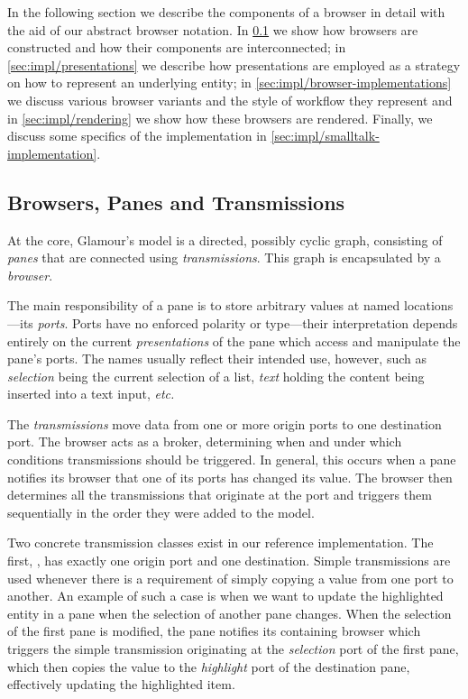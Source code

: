 \documentclass[a4paper,10pt,twoside]{book}
\begin{document}
In the following section we describe the components of a browser in
detail with the aid of our abstract browser notation. In
\ref{sec:impl/browsers-panes-transmissions} we show how browsers are
constructed and how their components are interconnected; in
\ref{sec:impl/presentations} we describe how presentations are
employed as a strategy on how to represent an underlying entity; in
\ref{sec:impl/browser-implementations} we discuss various browser
variants and the style of workflow they represent and in
\ref{sec:impl/rendering} we show how these browsers are
rendered. Finally, we discuss some specifics of the implementation in
\ref{sec:impl/smalltalk-implementation}.


\subsection{Browsers, Panes and Transmissions}
\label{sec:impl/browsers-panes-transmissions}

At the core, Glamour's model is a directed, possibly cyclic graph, consisting of \emph{panes} that are connected using \emph{transmissions}. This graph is encapsulated by a \emph{browser}.

The main responsibility of a pane is to store arbitrary values at named locations---its \emph{ports}. Ports have no enforced polarity or type---their interpretation depends entirely on the current \emph{presentations} of the pane which access and manipulate the pane's ports. The names usually reflect their intended use, however, such as \emph{selection} being the current selection of a list, \emph{text} holding the content being inserted into a text input, \emph{etc.} 

The \emph{transmissions} move data from one or more origin ports to one destination port. The browser acts as a broker, determining when and under which conditions transmissions should be triggered. In general, this occurs when a pane notifies its browser that one of its ports has changed its value. The browser then determines all the transmissions that originate at the port and triggers them sequentially in the order they were added to the model.

Two concrete transmission classes exist in our reference implementation. The first, , has exactly one origin port and one destination. Simple transmissions are used whenever there is a requirement of simply copying a value from one port to another. An example of such a case is when we want to update the highlighted entity in a pane when the selection of another pane changes. When the selection of the first pane is modified, the pane notifies its containing browser which triggers the simple transmission originating at the \emph{selection} port of the first pane, which then copies the value to the \emph{highlight} port of the destination pane, effectively updating the highlighted item.
\end{document}
